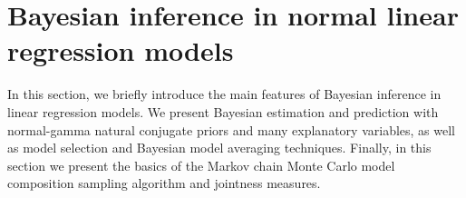 \section{Bayesian inference in normal linear regression models}\label{BmaGretlSec2}
In this section, we briefly introduce the main features of Bayesian
inference in linear regression models. We present Bayesian estimation
and prediction with normal-gamma natural conjugate priors and many
explanatory variables, as well as model selection and Bayesian model
averaging techniques. Finally, in this section we present the basics
of the Markov chain Monte Carlo model composition sampling algorithm and
jointness measures.




